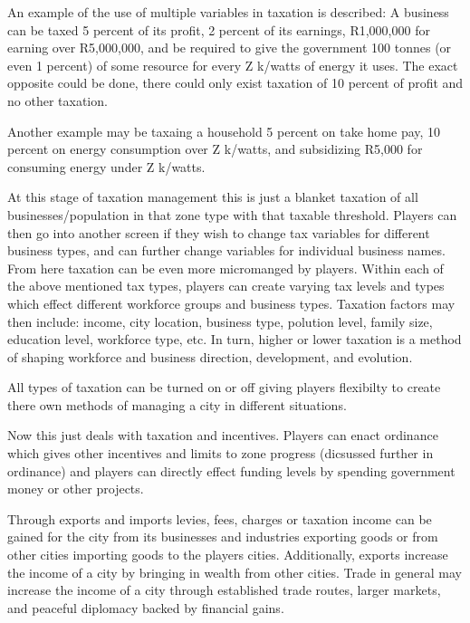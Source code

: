 An example of the use of multiple variables in taxation is described:
A business can be taxed 5 percent of its profit, 2 percent of its earnings, R1,000,000 for earning over R5,000,000, and be required to give the government 100 tonnes (or even 1 percent) of some resource for every Z k/watts of energy it uses. The exact opposite could be done, there could only exist taxation of 10 percent of profit and no other taxation. 

Another example may be taxaing a household 5 percent on take home pay, 10 percent on energy consumption over Z k/watts, and subsidizing R5,000 for consuming energy under Z k/watts.


At this stage of taxation management this is just a blanket taxation of all businesses/population in that zone type with that taxable threshold. Players can then go into another screen if they wish to change tax variables for different business types, and can further change variables for individual business names. From here taxation can be even more micromanged by players. Within each of the above mentioned tax types, players can create varying tax levels and types which effect different workforce groups and business types. Taxation factors may then include: income, city location, business type, polution level, family size, education level, workforce type, etc. In turn, higher or lower taxation is a method of shaping workforce and business direction, development, and evolution. 

All types of taxation can be turned on or off giving players flexibilty to create there own methods of managing a city in different situations.

Now this just deals with taxation and incentives. Players can enact ordinance which gives other incentives and limits to zone progress (dicsussed further in ordinance) and players can directly effect funding levels by spending government money or other projects. 




Through exports and imports levies, fees, charges or taxation income can be gained for the city from its businesses and industries exporting goods or from other cities importing goods to the players cities. Additionally, exports increase the income of a city by bringing in wealth from other cities. Trade in general may increase the income of a city through established trade routes, larger markets, and peaceful diplomacy backed by financial gains. 

